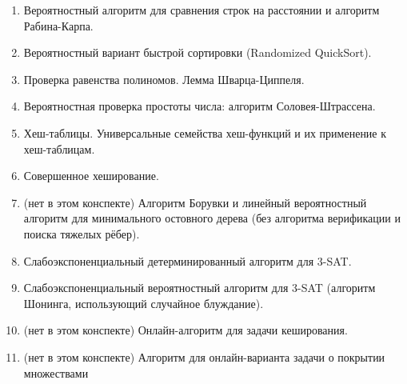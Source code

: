 \begin{enumerate}[wide, labelwidth=!, labelindent=0pt]
\item Вероятностный алгоритм для сравнения строк на расстоянии и алгоритм Рабина-Карпа.

\item Вероятностный вариант быстрой сортировки (Randomized QuickSort).

\item Проверка равенства полиномов. Лемма Шварца-Циппеля.

\item Вероятностная проверка простоты числа: алгоритм Соловея-Штрассена.

\item Хеш-таблицы. Универсальные семейства хеш-функций и их применение к хеш-таблицам.

\item Совершенное хеширование.

\item (нет в этом конспекте) Алгоритм Борувки и линейный вероятностный алгоритм для минимального остовного дерева (без алгоритма верификации и поиска тяжелых рёбер).

\item Слабоэкспоненциальный детерминированный алгоритм для 3-SAT.

\item Слабоэкспоненциальный вероятностный алгоритм для 3-SAT (алгоритм Шонинга, использующий случайное блуждание).

\item (нет в этом конспекте) Онлайн-алгоритм для задачи кеширования.

\item (нет в этом конспекте) Алгоритм для онлайн-варианта задачи о покрытии множествами
    
\end{enumerate}
